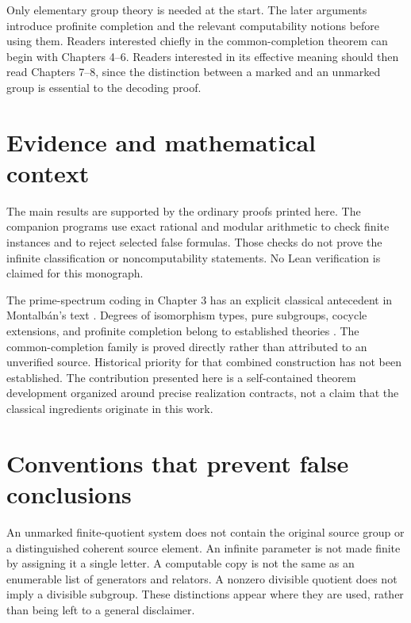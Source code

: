 Only elementary group theory is needed at the start. The later arguments introduce profinite completion and the relevant computability notions before using them. Readers interested chiefly in the common-completion theorem can begin with Chapters 4--6. Readers interested in its effective meaning should then read Chapters 7--8, since the distinction between a marked and an unmarked group is essential to the decoding proof.

\section*{Evidence and mathematical context}
The main results are supported by the ordinary proofs printed here. The companion programs use exact rational and modular arithmetic to check finite instances and to reject selected false formulas. Those checks do not prove the infinite classification or noncomputability statements. No Lean verification is claimed for this monograph.

The prime-spectrum coding in Chapter 3 has an explicit classical antecedent in Montalb\'an's text \cite{Montalban}. Degrees of isomorphism types, pure subgroups, cocycle extensions, and profinite completion belong to established theories \cite{Calvert,Fuchs,Lupini,Wilkes}. The common-completion family is proved directly rather than attributed to an unverified source. Historical priority for that combined construction has not been established. The contribution presented here is a self-contained theorem development organized around precise realization contracts, not a claim that the classical ingredients originate in this work.

\section*{Conventions that prevent false conclusions}
An unmarked finite-quotient system does not contain the original source group or a distinguished coherent source element. An infinite parameter is not made finite by assigning it a single letter. A computable copy is not the same as an enumerable list of generators and relators. A nonzero divisible quotient does not imply a divisible subgroup. These distinctions appear where they are used, rather than being left to a general disclaimer.
